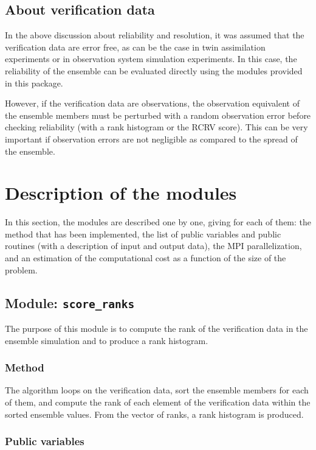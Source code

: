 \documentclass[11pt]{article}
\begin{document}
\subsection{About verification data}

In the above discussion about reliability and resolution,
it was assumed that the verification data are error free,
as can be the case in twin assimilation experiments or
in observation system simulation experiments.
In this case, the reliability of the ensemble
can be evaluated directly using the modules provided in this package.

However, if the verification data are observations,
the observation equivalent of the ensemble members
must be perturbed with a random observation error
before checking reliability (with a rank histogram or the RCRV score).
This can be very important if observation errors are not negligible
as compared to the spread of the ensemble.

\clearpage

\section{Description of the modules}

In this section,
the modules are described one by one,
giving for each of them:
the method that has been implemented,
the list of public variables and public routines
(with a description of input and output data),
the MPI parallelization, and
an estimation of the computational cost
as a function of the size of the problem.

\subsection{Module: {\tt\bf score\_ranks}}

The purpose of this module is to compute the rank
of the verification data in the ensemble simulation
and to produce a rank histogram.

\subsubsection*{Method}

The algorithm loops on the verification data,
sort the ensemble members for each of them,
and compute the rank of each element of the verification data
within the sorted ensemble values.
From the vector of ranks, a rank histogram is produced.

\subsubsection*{Public variables}
\end{document}
